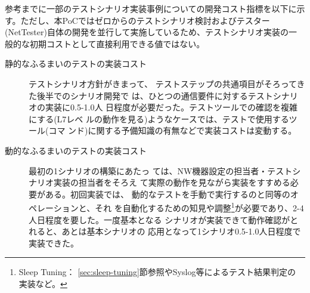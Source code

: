 参考までに一部のテストシナリオ実装事例についての開発コスト指標を以下に示
す。ただし、本PoCではゼロからのテストシナリオ検討およびテスター
(NetTester)自体の開発を並行して実施しているため、テストシナリオ実装の一
般的な初期コストとして直接利用できる値ではない。
\begin{description}
 \item[静的なふるまいのテストの実装コスト] テストシナリオ方針がきまって、
            テストステップの共通項目がそろってきた後半でのシナリオ開発で
            は、ひとつの通信要件に対するテストシナリオの実装に0.5-1.0人
            日程度が必要だった。テストツールでの確認を複雑にする(L7レベ
            ルの動作を見る)ようなケースでは、テストで使用するツール(コマ
            ンド)に関する予備知識の有無などで実装コストは変動する。
 \item[動的なふるまいのテストの実装コスト] 最初の1シナリオの構築にあたっ
            ては、NW機器設定の担当者・テストシナリオ実装の担当者をそろえ
            て実際の動作を見ながら実装をすすめる必要がある。初回実装では、
            動的なテストを手動で実行するのと同等のオペレーションと、それ
            を自動化するための知見や調整\footnote{Sleep Tuning：
            \ref{sec:sleep-tuning}節参照やSyslog等によるテスト結果判定の
            実装など。}が必要であり、2-4人日程度を要した。一度基本となる
            シナリオが実装できて動作確認がとれると、あとは基本シナリオの
            応用となって1シナリオ0.5-1.0人日程度で実装できた。
\end{description}


